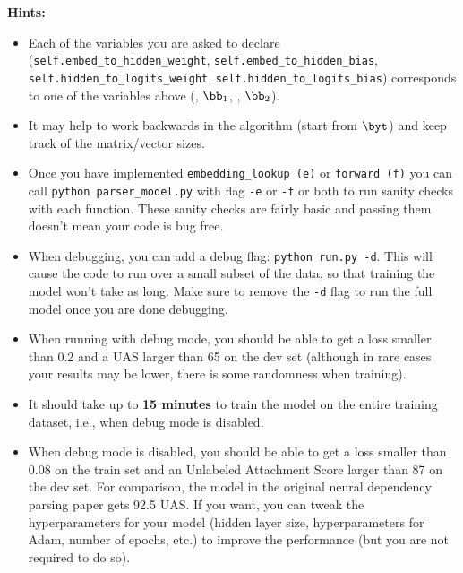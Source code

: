 \begin{parts}
\begin{enumerate}[label=\roman*.]
    \textbf{Hints:}
    \begin{itemize}
        \item Each of the variables you are asked to declare (\texttt{self.embed\_to\_hidden\_weight}, \newline \texttt{self.embed\_to\_hidden\_bias}, \texttt{self.hidden\_to\_logits\_weight}, \newline \texttt{self.hidden\_to\_logits\_bias}) corresponds to one of the variables above (\bW, $\bb_1$, \bU, $\bb_2$).  
        \item It may help to work backwards in the algorithm (start from $\byt$) and keep track of the matrix/vector sizes.  
        \item Once you have implemented \texttt{embedding\_lookup (e)} or \texttt{forward (f)} you can call \texttt{python parser\_model.py} with flag \texttt{-e} or \texttt{-f} or both to run sanity checks with each function. These sanity checks are fairly basic and passing them doesn't mean your code is bug free.
        \item
            When debugging, you can add a debug flag: \texttt{python run.py -d}. This will cause the code to run over a small subset of the data, so that training the model won't take as long. Make sure to remove the \texttt{-d} flag to run the full model once you are done debugging.

        \item
            When running with debug mode, you should be able to get a loss smaller than 0.2 and a UAS larger than 65 on the dev set (although in rare cases your results may be lower, there is some randomness when training).
        
        \item It should take up to \textbf{15 minutes} to train the model on the entire training dataset, i.e., when debug mode is disabled.
        
        \item When debug mode is disabled, you should be able to get a loss smaller than 0.08 on the train set and an Unlabeled Attachment Score larger than 87 on the dev set. For comparison, the model in the original neural dependency parsing paper gets 92.5 UAS. If you want, you can tweak the hyperparameters for your model (hidden layer size, hyperparameters for Adam, number of epochs, etc.) to improve the performance (but you are not required to do so).
    \end{itemize}
    

\end{enumerate}
\end{parts}
